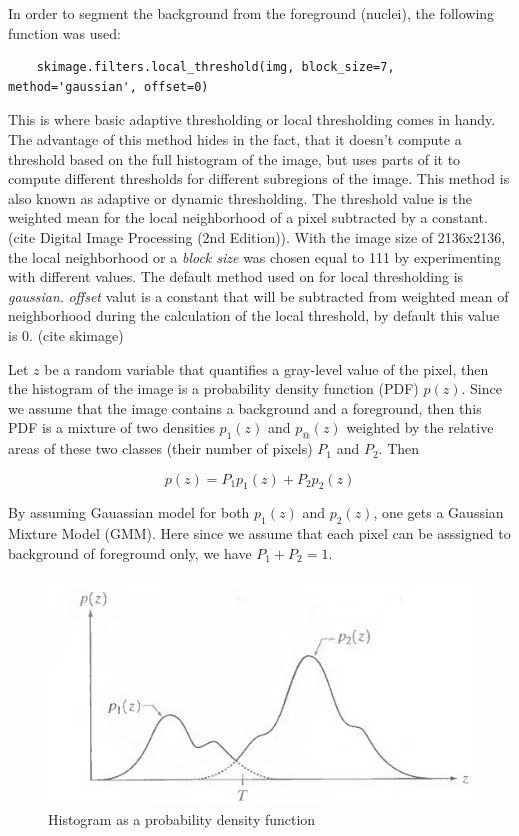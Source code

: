 In order to segment the background from the foreground (nuclei), the following function was used:

\begin{lstlisting}
    skimage.filters.local_threshold(img, block_size=7, method='gaussian', offset=0)
\end{lstlisting}

This is where basic adaptive thresholding or local thresholding comes in handy. The advantage of this method hides in the fact, that it doesn't compute a threshold based on the full histogram of the image, but uses parts of it to compute different thresholds for different subregions of the image. This method is also known as adaptive or dynamic thresholding. The threshold value is the weighted mean for the local neighborhood of a pixel subtracted by a constant. (cite Digital Image Processing (2nd Edition)). With the image size of 2136x2136, the local neighborhood or a \textit{block size} was chosen equal to 111 by experimenting with different values. The default method used on for local thresholding is \textit{gaussian}. \textit{offset} valut is a constant that will be subtracted from weighted mean of neighborhood during the calculation of the local threshold, by default this value is $0$. (cite skimage)

Let $z$ be a random variable that quantifies a gray-level value of the pixel, then the histogram of the image is a probability density function (PDF) $p(z)$. Since we assume that the image contains a background and a foreground, then this PDF is a mixture of two densities $p_1(z)$ and $p_@(z)$ weighted by the relative areas of these two classes (their number of pixels) $P_1$ and $P_2$. Then 

\begin{equation}
    p(z) = P_1 p_1(z) + P_2 p_2(z)
\end{equation}

By assuming Gauassian model for both $p_1(z)$ and $p_2(z)$, one gets a Gaussian Mixture Model (GMM). Here since we assume that each pixel can be asssigned to background of foreground only, we have $P_1 + P_2 = 1$. 

\begin{figure}[htb]
	\begin{center}
		\includegraphics[width=0.8\linewidth]{bilder/Gonzalez.png}
		\caption{Histogram as a probability density function}\label{fig:gmm}
	\end{center}
\end{figure}

